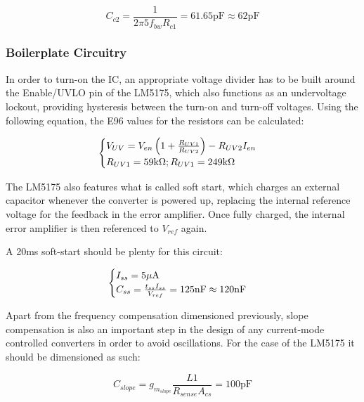 \documentclass[11pt, a4paper]{article}
\begin{document}
\begin{equation}
    C_{c2} = \frac{1}{2\pi 5 f_{bw} R_{c1}} = 61.65 \text{pF} \approx 62 \text{pF}    
\end{equation}

\subsubsection{Boilerplate Circuitry}

In order to turn-on the IC, an appropriate voltage divider has to be built around the Enable/UVLO pin of the LM5175, which also functions as an undervoltage lockout, providing hysteresis between the turn-on and turn-off voltages. Using the following equation, the E96 values for the resistors can be calculated:

\begin{eqnarray}
    \begin{cases}
        V_{UV} = V_{en} \left (1 + \frac{R_{UV1}}{R_{UV2}}\right ) - R_{UV2}I_{en} \\
        R_{UV1} = 59\text k\Omega; R_{UV1} = 249\text k\Omega 
    \end{cases}
\end{eqnarray}

The LM5175 also features what is called soft start, which charges an external capacitor whenever the converter is powered up, replacing the internal reference voltage for the feedback in the error amplifier. Once fully charged, the internal error amplifier is then referenced to $V_{ref}$ again.

A 20ms soft-start should be plenty for this circuit:

\begin{equation}
    \begin{cases}
        I_{ss} = 5\mu \text A \\        
        C_{ss} = \frac{t_{ss}I_{ss}}{V_{ref}} = 125 \text{nF} \approx 120 \text{nF} \\
    \end{cases}
\end{equation}

Apart from the frequency compensation dimensioned previously, slope compensation is also an important step in the design of any current-mode controlled converters in order to avoid oscillations. For the case of the LM5175 it should be dimensioned as such:

\begin{equation}
    C_{slope} = g_{m_{slope}}\frac{L1}{R_{sense}A_{cs}} = 100\text{pF}    
\end{equation}
\end{document}
